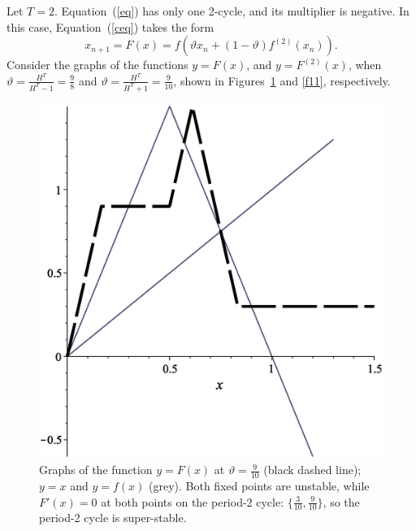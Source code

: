 \documentclass[12pt,a4paper]{amsart}
\begin{document}
Let $T=2.$ Equation~(\ref{eq}) has only one 2-cycle, and its multiplier is negative. In this case, Equation~(\ref{ceq}) 
takes the form 
$$x_{n+1} = F(x) = f \left( \vartheta x_n + (1 - \vartheta)f^{(2)}(x_n) \right).$$
Consider the graphs of the functions 
$y=F(x)$, and  $y=F^{(2)}(x)$, when
$\vartheta = \displaystyle{\frac{H^T}{H^T-1} = \frac{9}{8}}$ and $\vartheta = \displaystyle{\frac{H^T}{H^T+1} = \frac{9}{10}}$,
shown in Figures~\ref{f10} and \ref{f11}, respectively.

\begin{figure}[h!]
\centering
\includegraphics[scale=0.28]{Fig10}
\caption{Graphs of the function $y = F(x)$ at $\vartheta=\frac{9}{10}$ (black dashed line);
$y=x$ and $y=f(x)$ (grey).
Both fixed points are unstable, while $F'(x) = 0 $ at both points on the period-2 cycle: $\{ \frac{3}{10}, \frac{9}{10} \}$, so the period-2 cycle is super-stable. } \label{f10}
\end{figure}
\end{document}

